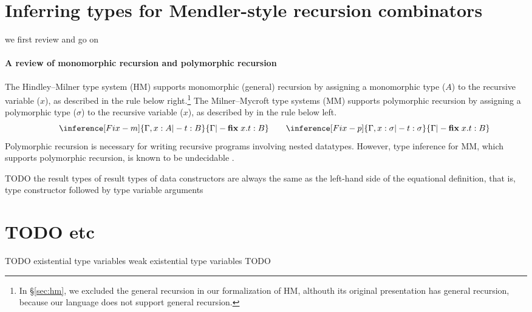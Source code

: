 \section{Inferring types for Mendler-style recursion combinators}
\label{sec:naxTyInfer:rec}
we first review and go on

\paragraph{A review of monomorphic recursion and polymorphic recursion}
The Hindley--Milner type system (HM) \cite{DamMil82} supports
monomorphic (general) recursion by assigning a monomorphic type ($A$)
to the recursive variable ($x$), as described in the rule 
below right.\footnote{
	In \S\ref{sec:hm}, we excluded the general recursion in
	our formalization of HM, althouth its original presentation
	has general recursion, because our language does not support
	general recursion.}
The Milner--Mycroft type systems (MM) \cite{TODO} supports
polymorphic recursion by assigning a polymorphic type ($\sigma$)
to the recursive variable ($x$), as described by in the rule 
below left.
\[
\qquad
\inference[\sc Fix-m]{\Gamma,x:A |- t : B}{
	\Gamma |- \textbf{fix}\;x.t : B}
\qquad
\inference[\sc Fix-p]{\Gamma,x:\sigma |- t : \sigma}{
	\Gamma |- \textbf{fix}\;x.t : B}
\]
Polymorphic recursion is necessary for writing recursive programs involving
nested datatypes. However, type inference for MM, which supports polymorphic
recursion, is known to be undecidable \cite{Hen93}.

TODO
the result types of 
result types of data constructors are always the same as the left-hand side
of the equational definition, that is, type constructor followed by
type variable arguments

\section{TODO etc}
\label{sec:naxTyInfer:etc}
TODO
existential type variables
weak existential type variables
TODO

